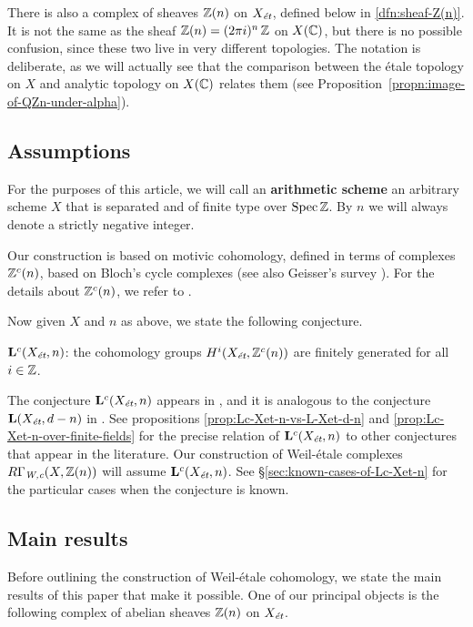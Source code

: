 \documentclass{article}
\numberwithin{equation}{section}
\begin{document}
There is also a complex of sheaves $\ZZ (n)$ on $X_\et$, defined below in
\ref{dfn:sheaf-Z(n)}. It is not the same as the sheaf
$\ZZ (n) = (2\pi i)^n\,\ZZ$ on $X (\CC)$, but there is no possible confusion,
since these two live in very different topologies. The notation is deliberate,
as we will actually see that the comparison between the étale topology on $X$
and analytic topology on $X (\CC)$ relates them
(see Proposition~\ref{propn:image-of-QZn-under-alpha}).

\subsection*{Assumptions}

For the purposes of this article, we will call an \textbf{arithmetic scheme} an
arbitrary scheme $X$ that is separated and of finite type over $\Spec \ZZ$.
By $n$ we will always denote a strictly negative integer.

Our construction is based on motivic cohomology, defined in terms of complexes
$\ZZ^c (n)$, based on Bloch's cycle complexes \cite{Bloch-1986} (see also
Geisser's survey \cite{Geisser-2005}). For the details about $\ZZ^c (n)$, we
refer to \cite[\S 2]{Geisser-2010}.

Now given $X$ and $n$ as above, we state the following conjecture.

\begin{conjecture}
  $\mathbf{L}^c (X_\et,n)$: the cohomology groups $H^i (X_\et, \ZZ^c (n))$ are
  finitely generated for all $i \in \ZZ$.
\end{conjecture}

The conjecture $\mathbf{L}^c (X_\et,n)$ appears in
\cite[Definition~5.8]{Morin-2014}, and it is analogous to the conjecture
$\mathbf{L} (X_\et,d-n)$ in \cite[\S 3.2]{Flach-Morin-2018}. See propositions
\ref{prop:Lc-Xet-n-vs-L-Xet-d-n} and \ref{prop:Lc-Xet-n-over-finite-fields} for
the precise relation of $\mathbf{L}^c (X_\et,n)$ to other conjectures that
appear in the literature. Our construction of Weil-étale complexes
$R\Gamma_\Wc (X,\ZZ(n))$ will assume $\mathbf{L}^c (X_\et,n)$.
See \S\ref{sec:known-cases-of-Lc-Xet-n} for the particular cases when the
conjecture is known.

\subsection*{Main results}

Before outlining the construction of Weil-étale cohomology, we state the main
results of this paper that make it possible. One of our principal objects is the
following complex of abelian sheaves $\ZZ (n)$ on $X_\et$.
\end{document}
